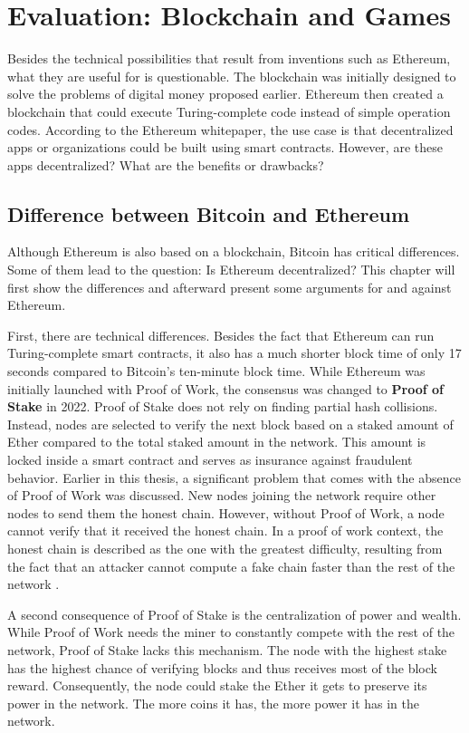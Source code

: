 \chapter{Evaluation: Blockchain and Games}

Besides the technical possibilities that result from inventions such as Ethereum, what they are useful for is questionable.
The blockchain was initially designed to solve the problems of digital money proposed earlier. 
Ethereum then created a blockchain that could execute Turing-complete code instead of simple operation codes.
According to the Ethereum whitepaper, the use case is that decentralized apps or organizations could be built using smart contracts.
However, are these apps decentralized? What are the benefits or drawbacks? 

\section{Difference between Bitcoin and Ethereum}
Although Ethereum is also based on a blockchain, Bitcoin has critical differences. \cite{Arslanian2022}
Some of them lead to the question: Is Ethereum decentralized?
This chapter will first show the differences and afterward present some arguments for and against Ethereum.

First, there are technical differences.
Besides the fact that Ethereum can run Turing-complete smart contracts, it also has a much shorter block time of only 17 seconds compared to Bitcoin's ten-minute block time.
While Ethereum was initially launched with Proof of Work, the consensus was changed to \textbf{Proof of Stake} in 2022. \cite{ethereum_merge}
Proof of Stake does not rely on finding partial hash collisions. Instead, nodes are selected to verify the next block based on a staked amount of Ether compared to the total staked amount in the network. 
This amount is locked inside a smart contract and serves as insurance against fraudulent behavior. \cite{proof_of_stake}
Earlier in this thesis, a significant problem that comes with the absence of Proof of Work was discussed.
New nodes joining the network require other nodes to send them the honest chain. 
However, without Proof of Work, a node cannot verify that it received the honest chain.
In a proof of work context, the honest chain is described as the one with the greatest difficulty, resulting from the fact that an attacker cannot compute a fake chain faster than the rest of the network \cite{nakamoto2008}.  

A second consequence of Proof of Stake is the centralization of power and wealth. While Proof of Work needs the miner to constantly compete with the rest of the network, Proof of Stake lacks this mechanism.
The node with the highest stake has the highest chance of verifying blocks and thus receives most of the block reward. 
Consequently, the node could stake the Ether it gets to preserve its power in the network.
The more coins it has, the more power it has in the network. 

